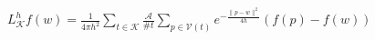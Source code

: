 \documentclass[12pt]{article}
\begin{document}
      $\displaystyle L^h_{\mathcal{K}} f(w) = \frac{1}{4 \pi h^2} \sum_{t \in \mathcal{K}} 
       \frac{\mathcal{A}}{\#t}  
       \sum_{p \in \mathcal{V}(t)} e^{-\frac{\|p-w\|^2}{4h}} (f(p) - f(w))$   
    
  
\end{document}
